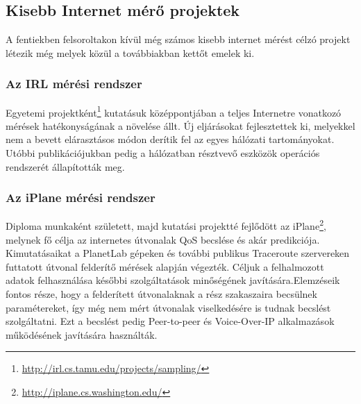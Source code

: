 \subsection{Kisebb Internet mérő projektek}

A fentiekben felsoroltakon kívül még számos kisebb internet mérést célzó projekt létezik még melyek közül a továbbiakban kettőt emelek ki.

\subsubsection*{Az IRL mérési rendszer}
 
 
Egyetemi projektként\footnote{\url{http://irl.cs.tamu.edu/projects/sampling/}} kutatásuk középpontjában a teljes Internetre vonatkozó mérések hatékonyságának a növelése állt. Új eljárásokat fejlesztettek ki, melyekkel nem a bevett elárasztásos módon derítik fel az egyes hálózati tartományokat. Utóbbi publikációjukban\cite{irl-measure} pedig a hálózatban résztvevő eszközök operációs rendszerét állapították meg.
 



\subsubsection*{Az iPlane mérési rendszer}
 


Diploma munkaként született, majd kutatási projektté fejlődött az iPlane\footnote{\url{http://iplane.cs.washington.edu/}}, melynek fő célja az internetes útvonalak QoS becslése és akár predikciója. Kimutatásaikat a PlanetLab gépeken és további publikus Traceroute szervereken futtatott útvonal felderítő mérések alapján végezték. Céljuk a felhalmozott adatok felhasználása későbbi szolgáltatások minőségének javítására.Elemzéseik fontos része, hogy a felderített útvonalaknak a rész szakaszaira becsülnek paramétereket, így még nem mért útvonalak viselkedésére is tudnak becslést szolgáltatni. Ezt a becslést pedig Peer-to-peer és Voice-Over-IP alkalmazások működésének javítására használták.

